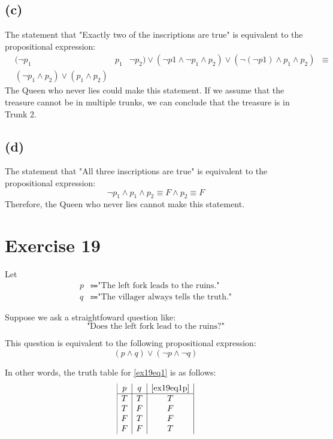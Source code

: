 \documentclass{article}
\begin{document}
\subsection{(c)}
The statement that "Exactly two of the inscriptions are true" is equivalent to the propositional expression:
\begin{align*}
	 & (\neg p_1                                 & p_1 & \neg p_2) \lor (\neg p1 \land \neg p_1 \land p_2) \lor (\neg (\neg p1) \land p_1 \land p_2) & \equiv \\
	 & (\neg p_1 \land p_2) \lor (p_1 \land p_2)
\end{align*}
The Queen who never lies could make this statement. If we assume that the treasure cannot be in multiple trunks, we can conclude that the treasure is in Trunk 2.

\subsection{(d)}
The statement that "All three inscriptions are true" is equivalent to the propositional expression:
\[
	\neg p_1 \land p_1 \land p_2 \equiv F \land p_2 \equiv F
\]
Therefore, the Queen who never lies cannot make this statement.

\pagebreak

\section{Exercise 19}
Let
\begin{align*}
	p & \Coloneqq \text{"The left fork leads to the ruins."}    \\
	q & \Coloneqq \text{"The villager always tells the truth."}
\end{align*}

Suppose we ask a straightfoward question like:
\begin{equation}\label{ex19eq1}
	\text{"Does the left fork lead to the ruins?"}
\end{equation}

This question is equivalent to the following propositional expression:
\begin{equation}\label{ex19eq1p}
	(p \land q) \lor (\neg p \land \neg q)
\end{equation}

In other words, the truth table for \eqref{ex19eq1} is as follows:
\[
	\begin{array}{|c|c|c|}
		p & q & \eqref{ex19eq1p} \\
		\hline
		T & T & T                \\
		T & F & F                \\
		F & T & F                \\
		F & F & T
	\end{array}
\]
\end{document}
